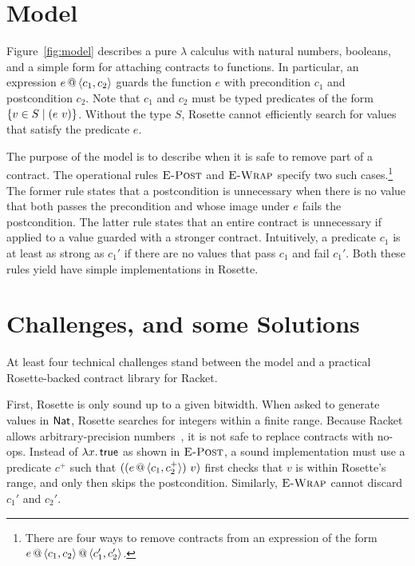 \documentclass[nocopyrightspace,preprint,9pt]{sigplanconf}
\begin{document}
\section{Model}

Figure~\ref{fig:model} describes a pure $\lambda$ calculus with natural numbers, booleans, and a simple form for attaching contracts to functions.
In particular, an expression $e\,@\,\langle c_1,c_2 \rangle$ guards the function $e$ with precondition $c_1$ and postcondition $c_2$.
Note that $c_1$ and $c_2$ must be typed predicates of the form $\{ v \in S \mid (e~v) \}$.
Without the type $S$, Rosette cannot efficiently search for values that satisfy the predicate $e$.

The purpose of the model is to describe when it is safe to remove part of a contract.
The operational rules $\textsc{E-Post}$ and $\textsc{E-Wrap}$ specify two such cases.\footnote{There are four ways to remove contracts from an expression of the form $e\,@\,\langle c_1,c_2 \rangle\,@\,\langle c_1',c_2' \rangle$.}
The former rule states that a postcondition is unnecessary when there is no value that both passes the precondition and whose image under $e$ fails the postcondition.
The latter rule states that an entire contract is unnecessary if applied to a value guarded with a stronger contract.
Intuitively, a predicate $c_1$ is at least as strong as $c_1'$ if there are no values that pass $c_1$ and fail $c_1'$.
Both these rules yield have simple implementations in Rosette.


\section{Challenges, and some Solutions}

At least four technical challenges stand between the model and a practical Rosette-backed contract library for Racket.

First, Rosette is only sound up to a given bitwidth.
When asked to generate values in $\mathsf{Nat}$, Rosette searches for integers within a finite range.
Because Racket allows arbitrary-precision numbers~\cite{stff-padl-2012}, it is not safe to replace contracts with no-ops.
Instead of $\lambda x.\,\mathsf{true}$ as shown in $\textsc{E-Post}$, a sound implementation must use a predicate $c^+$ such that $((e\,@\,\langle c_1,c_2^+ \rangle)~v)$ first checks that $v$ is within Rosette's range, and only then skips the postcondition.
Similarly, $\textsc{E-Wrap}$ cannot discard $c_1'$ and $c_2'$.
\end{document}
